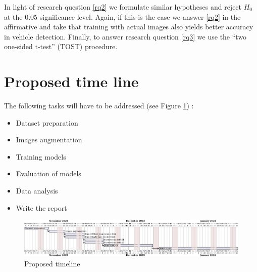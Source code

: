 \documentclass[]{article}
\begin{document}
	In light of research question \ref{rq2} we formulate similar hypotheses and reject $H_0$ at the 0.05 significance level. Again, if this is the case we answer \ref{rq2} in the affirmative and take that training with actual images also yields better accuracy in vehicle detection.
	Finally, to answer research question \ref{rq3} we use the ``two one-sided t-test'' (TOST) procedure.

\section{Proposed time line}

The following tasks will have to be addressed (see Figure \ref{fig:timeline}) :
\begin{itemize}
	\item Dataset preparation
	\item Images augmentation
	\item Training models
	\item Evaluation of models
	\item Data analysis
	\item Write the report
\end{itemize}

\begin{figure}[H]
	\centering
	\includegraphics[width=\textwidth]{proposal-timing}
	\caption{Proposed timeline}
	\label{fig:timeline}
\end{figure}

\printbibliography
\end{document}
